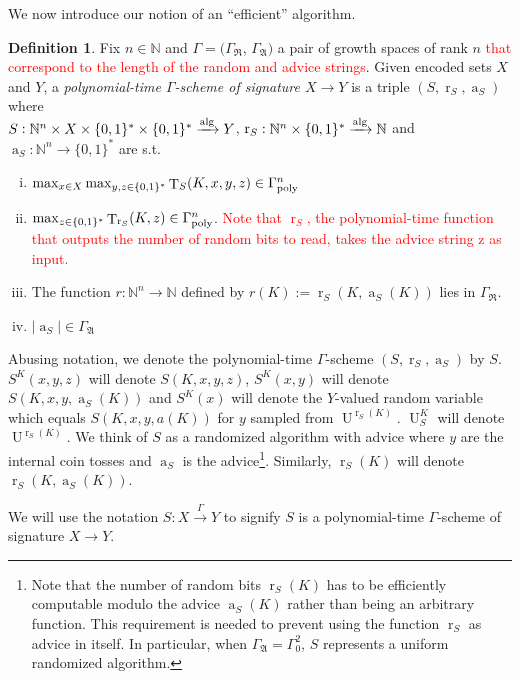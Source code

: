 \documentclass[11pt]{article}
\numberwithin{equation}{section}
\theoremstyle{definition}
\newtheorem{definition}{Definition}[section]
\theoremstyle{plain}
\newcommand{\Bool}{\{0,1\}}
\newcommand{\Words}{{\Bool^*}}
\DeclareMathOperator{\T}{T}
\DeclareMathOperator{\R}{r}
\DeclareMathOperator{\A}{a}
\DeclareMathOperator{\Un}{U}
\newcommand{\Nats}{\mathbb{N}}
\newcommand{\NatFun}{\Nats^n \rightarrow}
\newcommand{\Abs}[1]{\lvert #1 \rvert}
\newcommand{\GrowR}{\Gamma_{\mathfrak{R}}}
\newcommand{\GrowA}{\Gamma_{\mathfrak{A}}}
\newcommand{\GammaPoly}{\Gamma_{\textnormal{poly}}}
\newcommand{\Alg}{\xrightarrow{\textnormal{alg}}}
\newcommand{\Scheme}{\xrightarrow{\Gamma}}
\begin{document}
We now introduce our notion of an \enquote{efficient} algorithm.

\begin{samepage}
\begin{definition}

Fix $n \in \Nats$ and $\Gamma=(\GrowR$, $\GrowA)$ a pair of growth spaces of rank $n$ \textcolor{red}{that correspond to the length of the random and advice strings}. Given encoded sets $X$ and $Y$, a \emph{polynomial-time $\Gamma$-scheme of signature $X \rightarrow Y$} is a triple $(S,\R_S,\A_S)$ where\\ ${S: \Nats^n \times X \times \Words \times \Words \Alg Y}$, $\R_S: \Nats^n \times \Words \Alg \Nats$ and $\A_S: \NatFun \Words$ are s.t.

\begin{enumerate}[(i)]

\item $\max_{x \in X} \max_{y,z \in \Words} \T_S(K,x,y,z) \in \GammaPoly^n$

\item $\max_{z \in \Words} \T_{\R_S}(K,z) \in \GammaPoly^n$. \textcolor{red}{Note that $\R_S$, the polynomial-time function that outputs the number of random bits to read, takes the advice string z as input.}

\item The function $r: \NatFun \Nats$ defined by $r(K):=\R_S(K,\A_S(K))$ lies in $\GrowR$.

\item $\Abs{\A_S} \in \GrowA$

\end{enumerate}
Abusing notation, we denote the polynomial-time $\Gamma$-scheme $(S,\R_S,\A_S)$ by $S$. $S^K(x,y,z)$ will denote $S(K,x,y,z)$, $S^K(x,y)$ will denote $S(K,x,y,\A_S(K))$ and $S^K(x)$ will denote the $Y$-valued random variable which equals $S(K,x,y,a(K))$ for $y$ sampled from $\Un^{\R_S(K)}$. $\Un_S^K$ will denote $\Un^{\R_S(K)}$. We think of $S$ as a randomized algorithm with advice where $y$ are the internal coin tosses and $\A_S$ is the advice\footnote{Note that the number of random bits $\R_S(K)$ has to be efficiently computable modulo the advice $\A_S(K)$ rather than being an arbitrary function. This requirement is needed to prevent using the function $\R_S$ as advice in itself. In particular, when $\GrowA=\Gamma_0^2$, $S$ represents a uniform randomized algorithm.}. Similarly, $\R_S(K)$ will denote $\R_S(K,\A_S(K))$.

We will use the notation $S: X \Scheme Y$ to signify $S$ is a polynomial-time $\Gamma$-scheme of signature $X \rightarrow Y$.

\end{definition}
\end{samepage}
\end{document}
